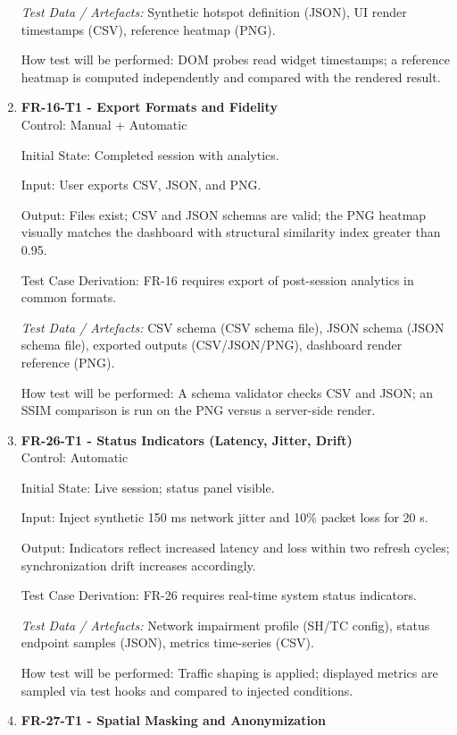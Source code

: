 \documentclass[12pt, titlepage]{article}
\begin{document}
\begin{enumerate}
\textit{Test Data / Artefacts:} Synthetic hotspot definition (JSON), UI render timestamps (CSV), reference heatmap (PNG).

How test will be performed: DOM probes read widget timestamps; a reference heatmap is computed independently and compared with the rendered result.

\item \textbf{FR-16-T1 - Export Formats and Fidelity} \\

Control: Manual + Automatic

Initial State: Completed session with analytics.

Input: User exports CSV, JSON, and PNG.

Output: Files exist; CSV and JSON schemas are valid; the PNG heatmap visually matches the dashboard with structural similarity index greater than 0.95.

Test Case Derivation: FR-16 requires export of post-session analytics in common formats.

\textit{Test Data / Artefacts:} CSV schema (CSV schema file), JSON schema (JSON schema file), exported outputs (CSV/JSON/PNG), dashboard render reference (PNG).

How test will be performed: A schema validator checks CSV and JSON; an SSIM comparison is run on the PNG versus a server-side render.

\item \textbf{FR-26-T1 - Status Indicators (Latency, Jitter, Drift)} \\

Control: Automatic

Initial State: Live session; status panel visible.

Input: Inject synthetic 150 ms network jitter and 10\% packet loss for 20 s.

Output: Indicators reflect increased latency and loss within two refresh cycles; synchronization drift increases accordingly.

Test Case Derivation: FR-26 requires real-time system status indicators.

\textit{Test Data / Artefacts:} Network impairment profile (SH/TC config), status endpoint samples (JSON), metrics time-series (CSV).

How test will be performed: Traffic shaping is applied; displayed metrics are sampled via test hooks and compared to injected conditions.

\item \textbf{FR-27-T1 - Spatial Masking and Anonymization} \\


\end{enumerate}
\end{document}
